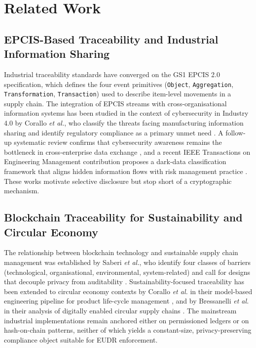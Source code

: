 \documentclass[journal]{IEEEtran}
\begin{document}
\section{Related Work}
\label{sec:related}

\subsection{EPCIS-Based Traceability and Industrial Information Sharing}
Industrial traceability standards have converged on the GS1 EPCIS 2.0 specification, which defines the four event primitives (\texttt{Object}, \texttt{Aggregation}, \texttt{Transformation}, \texttt{Transaction}) used to describe item-level movements in a supply chain. The integration of EPCIS streams with cross-organisational information systems has been studied in the context of cybersecurity in Industry 4.0 by Corallo \emph{et al.}, who classify the threats facing manufacturing information sharing and identify regulatory compliance as a primary unmet need \cite{corallo2020cybersecurity}. A follow-up systematic review confirms that cybersecurity awareness remains the bottleneck in cross-enterprise data exchange \cite{corallo2022awareness}, and a recent IEEE Transactions on Engineering Management contribution proposes a dark-data classification framework that aligns hidden information flows with risk management practice \cite{corallo2023darkdata, lezzi2024tem}. These works motivate selective disclosure but stop short of a cryptographic mechanism.

\subsection{Blockchain Traceability for Sustainability and Circular Economy}
The relationship between blockchain technology and sustainable supply chain management was established by Saberi \emph{et al.}, who identify four classes of barriers (technological, organisational, environmental, system-related) and call for designs that decouple privacy from auditability \cite{saberi2019blockchain}. Sustainability-focused traceability has been extended to circular economy contexts by Corallo \emph{et al.} in their model-based engineering pipeline for product life-cycle management \cite{corallo2022mbe}, and by Bressanelli \emph{et al.} in their analysis of digitally enabled circular supply chains \cite{bressanelli2020circular}. The mainstream industrial implementations remain anchored either on permissioned ledgers or on hash-on-chain patterns, neither of which yields a constant-size, privacy-preserving compliance object suitable for EUDR enforcement.
\end{document}
